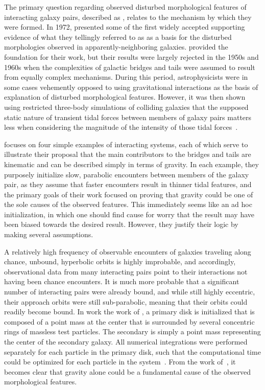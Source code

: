 The primary question regarding observed disturbed morphological features
of interacting galaxy pairs, described as , relates to
the mechanism by which they were formed.
In 1972, \citet{Toomre1972} presented some of the first widely
accepted supporting
evidence of what they tellingly referred to as 
as a basis for the disturbed morphologies observed in apparently-neighboring
galaxies. \citet{German} provided the
foundation for their work, but their results were largely rejected in the 1950s
and 1960s when the complexities of galactic bridges and tails were assumed to
result from equally complex mechanisms.
During this period, astrophysicists were in some cases vehemently
opposed to using gravitational interactions as the basis of explanation of
disturbed morphological features. However, it was then
shown using restricted three-body simulations of colliding galaxies
that the supposed static nature of transient tidal forces between
members of galaxy pairs matters less when considering the magnitude of the
intensity of those tidal forces~\cite{Toomre1972}.


\citet{Toomre1972} focuses on four simple examples of interacting systems, each
of which serve to illustrate their proposal that the main contributors to the
bridges and tails are kinematic and can be described simply in terms of
gravity.
In each example, they purposely initialize slow,
parabolic encounters between members of the
galaxy pair, as they assume that faster encounters result in thinner tidal
features, and the primary goals of their work focused on proving that gravity
could be one of the sole causes of the observed features.
This immediately seems like an ad hoc initialization, in which
one should find cause for worry that the result may have been biased
towards the desired result. However, they justify their logic by making several
assumptions.

A relatively high frequency of observable encounters of
galaxies traveling along chance, unbound, hyperbolic orbits is
highly improbable, and accordingly,
observational data from many interacting pairs point to their interactions
not having been chance encounters.
It is much more probable that a significant number of interacting pairs were
already bound, and while still highly eccentric, their approach orbits were
still sub-parabolic, meaning that their orbits could readily become bound.
In work the work of \citet{Toomre1972}, a primary disk is initialized that
is composed of a point mass at the center that is surrounded by several
concentric rings of massless test particles.
The secondary  is simply a point mass
representing the center of the secondary galaxy. All numerical integrations were
performed separately for each particle in the primary disk, such that the
computational time could be optimized for each particle in the
system~\cite{Toomre1972}. From the work of~\citet{Toomre1972}, it becomes clear
that gravity alone could be a fundamental cause of the observed morphological
features.

